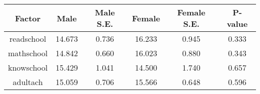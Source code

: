 \begin{longtable}{c c c c c c}
\toprule
\textbf{Factor} & \textbf{Male} & \textbf{Male S.E.}  & \textbf{Female} & \textbf{Female S.E.} & \textbf{P-value} \\
\midrule
readschool & 14.673 & 0.736 &  16.233 & 0.945 & 0.333 \\
mathschool & 14.842 & 0.660 &  16.023 & 0.880 & 0.343 \\
knowschool & 15.429 & 1.041 &  14.500 & 1.740 & 0.657 \\
adultach & 15.059 & 0.706 &  15.566 & 0.648 & 0.596 \\
\bottomrule
\end{longtable}
